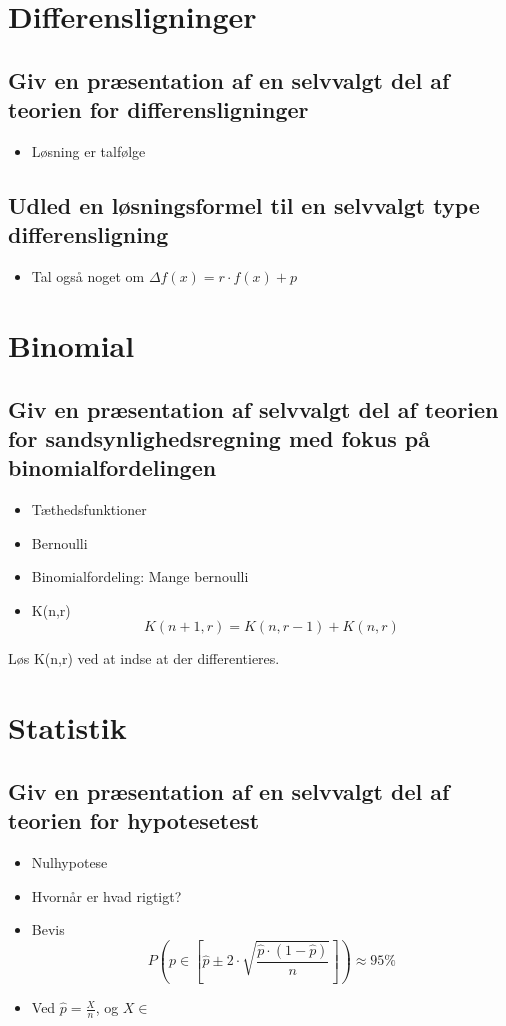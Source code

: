 \documentclass{article}
\begin{document}
\section{Differensligninger}
\subsection{Giv en præsentation af en selvvalgt del af teorien for differensligninger}
\begin{itemize}
	\item Løsning er talfølge
\end{itemize}
\subsection{Udled en løsningsformel til en selvvalgt type differensligning}
\begin{itemize}
	\item Tal også noget om $\Delta f(x) = r\cdot  f(x)+p$
\end{itemize}

\section{Binomial}
\subsection{Giv en præsentation af selvvalgt del af teorien for sandsynlighedsregning med fokus på 
binomialfordelingen}
\begin{itemize}
	\item Tæthedsfunktioner
	\item Bernoulli
	\item Binomialfordeling: Mange bernoulli
	\item K(n,r)
		\[
			K(n + 1, r) = K(n, r-1) + K(n, r)
		\]
\end{itemize}


Løs K(n,r) ved at indse at der differentieres.

\section{Statistik}
\subsection{Giv en præsentation af en selvvalgt del af teorien for hypotesetest}
\begin{itemize}
	\item Nulhypotese
	\item Hvornår er hvad rigtigt?
	\item Bevis
		\[
			P(p\in[\hat p \pm 2\cdot\sqrt{\frac{\hat p\cdot(1-\hat p)}{n}}]) \approx 95\%
		\]
	\item Ved $\hat p = \frac{X}{n}$, og $X \in $
\end{itemize}
\end{document}
